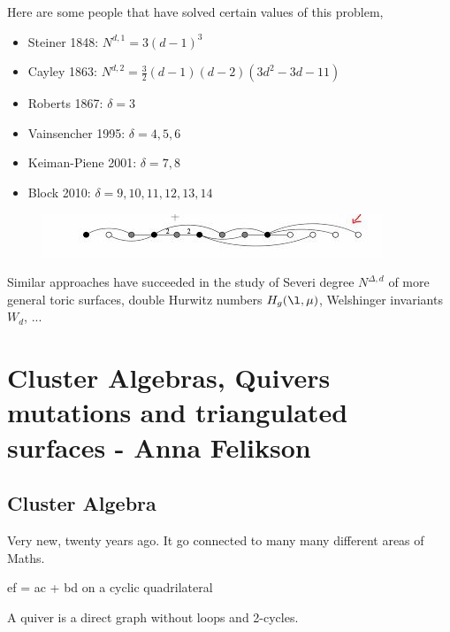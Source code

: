 \documentclass{article}
\begin{document}
\begin{eg} Here are some people that have solved certain values of this problem,
  \begin{itemize}
    \item Steiner 1848: $N^{d,1} = 3(d - 1)^3$
    \item Cayley 1863: $N^{d,2} = \frac{3}{2}(d - 1)(d-2)(3d^2 - 3d - 11)$
    \item Roberts 1867: $\delta = 3$
    \item Vainsencher 1995: $\delta = 4, 5, 6$
    \item Keiman-Piene 2001: $\delta = 7,8$
    \item Block 2010: $\delta = 9, 10, 11, 12, 13, 14$
  \end{itemize}
  \begin{figure}[!ht]
  \centering
  \includegraphics{./figures/L2.11}
  \end{figure}
\end{eg}

Similar approaches have succeeded in the study of Severi degree $N^{\Delta, d}$ of more general toric surfaces, double Hurwitz numbers $H_g(\l, \mu)$, Welshinger invariants $W_d$, ...


\section{Cluster Algebras, Quivers mutations and triangulated surfaces - Anna Felikson}

\subsection{Cluster Algebra}
Very new, twenty years ago. It go connected to many many different areas of Maths.

\begin{nthm}
  ef = ac + bd on a cyclic quadrilateral
\end{nthm}


\begin{ndefi}[Quiver]
  A quiver is a direct graph without loops and 2-cycles.
\end{ndefi}
\end{document}
